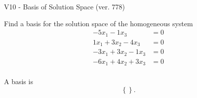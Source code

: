 \begin{exercise}
  \begin{exerciseTitle}V10 - Basis of Solution Space (ver. 778)\end{exerciseTitle}
  \begin{exerciseStatement}
    Find a basis for the solution space of the homogeneous system 
\begin{align*}
 -5 x_ 1 -1 x_ 3 &= 0  \\ 
  1 x_ 1 + 3 x_ 2 -4 x_ 3 &= 0  \\ 
  -3 x_ 1 + 3 x_ 2 -1 x_ 3 &= 0  \\ 
  -6 x_ 1 + 4 x_ 2 + 3 x_ 3 &= 0  \\ 
 \end{align*}


 
  \end{exerciseStatement}

  \begin{exerciseAnswer}
   A basis is   
\[\left\{\right\}.\]

  


  \end{exerciseAnswer}
\end{exercise}